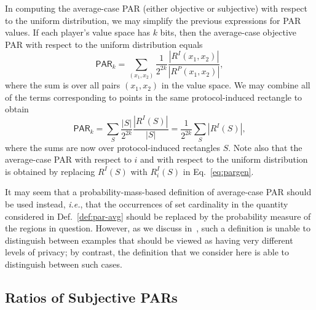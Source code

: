 \documentclass{article}
\theoremstyle{theorem}
\theoremstyle{definition}
\theoremstyle{remark}
\newcommand{\ie}{\emph{i.e.}}
\begin{document}
In computing the average-case PAR (either objective or subjective) with respect
to the uniform distribution, we may simplify the previous expressions for PAR values.
If each player's value space has $k$ bits, then the average-case objective PAR with
respect to the uniform distribution equals
\begin{equation*}
\mathsf{PAR}_k = \sum_{(x_1,x_2)} \frac{1}{2^{2k}} \frac{|R^I(x_1,x_2)|}{|R^{P}(x_1,x_2)|},
\end{equation*}
where the sum is over all pairs $(x_1,x_2)$ in the value space.
We may combine all of the terms corresponding to points in the same protocol-induced
rectangle to obtain
\begin{equation}
\mathsf{PAR}_k = \sum_{S} \frac{|S|}{2^{2k}} \frac{|R^I(S)|}{|S|} = \frac{1}{2^{2k}} \sum_{S} |R^I(S)|,\label{eq:pargen}
\end{equation}
where the sums are now over protocol-induced rectangles $S$.  Note also that the
average-case PAR with respect to $i$ and with respect to the uniform distribution
is obtained by replacing $R^I(S)$ with $R^I_i(S)$ in Eq.~\ref{eq:pargen}.

It may seem that a probability-mass-based definition of average-case PAR should be used instead, \ie, that the occurrences of set cardinality in the quantity considered in Def.~\ref{def:par-avg} should be replaced by the probability measure of the regions in question.  However, as we discuss in~\cite{fjs09tr14}, such a definition is unable to distinguish between examples that should be viewed as having very different levels of privacy; by contrast, the definition that we consider here is able to distinguish between such cases.

\subsection{Ratios of Subjective PARs}\label{ssec:ratio}
\end{document}
